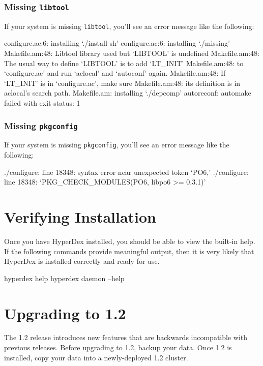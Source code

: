 \subsubsection{Missing \texttt{libtool}}
\label{sec:installation:troubleshooting:libtool}

If your system is missing \texttt{libtool}, you'll see an error message like the
following:

\begin{consolecode}
configure.ac:6: installing `./install-sh'
configure.ac:6: installing `./missing'
Makefile.am:48: Libtool library used but `LIBTOOL' is undefined
Makefile.am:48:   The usual way to define `LIBTOOL' is to add `LT_INIT'
Makefile.am:48:   to `configure.ac' and run `aclocal' and `autoconf' again.
Makefile.am:48:   If `LT_INIT' is in `configure.ac', make sure
Makefile.am:48:   its definition is in aclocal's search path.
Makefile.am: installing `./depcomp'
autoreconf: automake failed with exit status: 1
\end{consolecode}

\subsubsection{Missing \texttt{pkgconfig}}
\label{sec:installation:troubleshooting:pkgconfig}

If your system is missing \texttt{pkgconfig}, you'll see an error message like
the following:

\begin{consolecode}
./configure: line 18348: syntax error near unexpected token `PO6,'
./configure: line 18348: `PKG_CHECK_MODULES(PO6, libpo6 >= 0.3.1)'
\end{consolecode}

\section{Verifying Installation}
\label{sec:installation:verify}

Once you have HyperDex installed, you should be able to view the built-in help.
If the following commands provide meaningful output, then it is very likely that
HyperDex is installed correctly and ready for use.

\begin{consolecode}
hyperdex help
hyperdex daemon --help
\end{consolecode}

\section{Upgrading to 1.2}
\label{sec:installation:upgrade1.2}

The 1.2 release introduces new features that are backwards incompatible with
previous releases.  Before upgrading to 1.2, backup your data.  Once 1.2 is
installed, copy your data into a newly-deployed 1.2 cluster.
